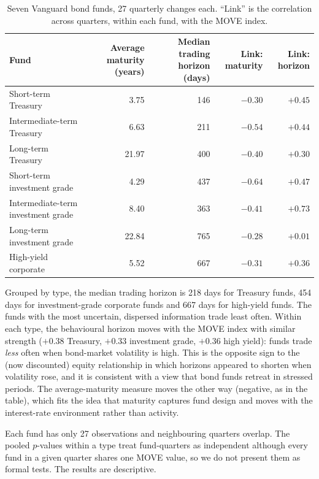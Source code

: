\begin{table}[htbp]
\centering
\caption{Seven Vanguard bond funds, 27 quarterly changes each. ``Link'' is the correlation across quarters, within each fund, with the MOVE index.}
\label{tab:bonds}
\small
\begin{tabular}{lrrrr}
\toprule
Fund & Average maturity (years) & Median trading horizon (days) & Link: maturity & Link: horizon\\
\midrule
Short-term Treasury & 3.75 & 146 & $-0.30$ & $+0.45$\\
Intermediate-term Treasury & 6.63 & 211 & $-0.54$ & $+0.44$\\
Long-term Treasury & 21.97 & 400 & $-0.40$ & $+0.30$\\
Short-term investment grade & 4.29 & 437 & $-0.64$ & $+0.47$\\
Intermediate-term investment grade & 8.40 & 363 & $-0.41$ & $+0.73$\\
Long-term investment grade & 22.84 & 765 & $-0.28$ & $+0.01$\\
High-yield corporate & 5.52 & 667 & $-0.31$ & $+0.36$\\
\bottomrule
\end{tabular}
\end{table}

Grouped by type, the median trading horizon is 218 days for Treasury funds, 454 days for investment-grade corporate funds and 667 days for high-yield funds. The funds with the most uncertain, dispersed information trade least often. Within each type, the behavioural horizon moves with the MOVE index with similar strength ($+0.38$ Treasury, $+0.33$ investment grade, $+0.36$ high yield): funds trade \emph{less} often when bond-market volatility is high. This is the opposite sign to the (now discounted) equity relationship in which horizons appeared to shorten when volatility rose, and it is consistent with a view that bond funds retreat in stressed periods. The average-maturity measure moves the other way (negative, as in the table), which fits the idea that maturity captures fund design and moves with the interest-rate environment rather than activity.

\begin{caution}
Each fund has only 27 observations and neighbouring quarters overlap. The pooled $p$-values within a type treat fund-quarters as independent although every fund in a given quarter shares one MOVE value, so we do not present them as formal tests. The results are descriptive.
\end{caution}

